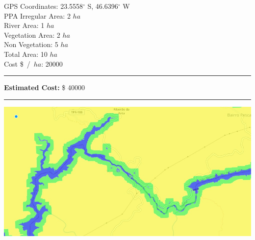 \documentclass{article}
\begin{document}
    \begin{minipage}{0.5\linewidth}

    GPS Coordinates: 23.5558$^{\circ}$ S, 46.6396$^{\circ}$ W    \\
    PPA Irregular Area: 2 $ha$  \\
    River Area: 1 $ha$              \\
    Vegetation Area: 2 $ha$           \\
    Non Vegetation: 5 $ha$           \\
    Total Area: 10 $ha$              \\
    Cost \$~/~$ha$: 20000               \\
    \rule{\linewidth}{1pt}
    \textbf{Estimated Cost:} \$ 40000           \\
    \rule{\linewidth}{1pt}

    \end{minipage}\hfil
    \begin{minipage}{0.5\linewidth}
        \includegraphics[width=\linewidth]{map.jpg}
    \end{minipage}
    
    
\end{document}
